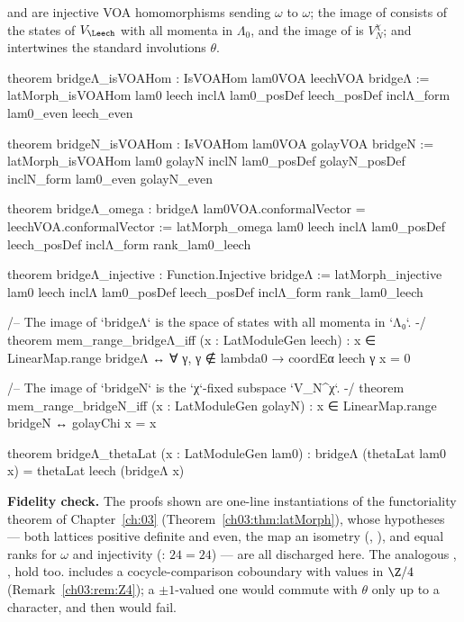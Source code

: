 \begin{theorem}\label{ch11:thm:bridges}
 and  are injective VOA homomorphisms sending $\omega$ to $\omega$; the image
of  consists of the states of $V_\Leech$ with all momenta in $\Lambda_0$, and the image of
 is $V_N^\chi$; and  intertwines the standard involutions $\theta$.
\end{theorem}
\begin{leancode}
theorem bridgeΛ_isVOAHom : IsVOAHom lam0VOA leechVOA bridgeΛ :=
  latMorph_isVOAHom lam0 leech inclΛ lam0_posDef leech_posDef inclΛ_form lam0_even leech_even

theorem bridgeN_isVOAHom : IsVOAHom lam0VOA golayVOA bridgeN :=
  latMorph_isVOAHom lam0 golayN inclN lam0_posDef golayN_posDef inclN_form lam0_even golayN_even

theorem bridgeΛ_omega : bridgeΛ lam0VOA.conformalVector = leechVOA.conformalVector :=
  latMorph_omega lam0 leech inclΛ lam0_posDef leech_posDef inclΛ_form rank_lam0_leech

theorem bridgeΛ_injective : Function.Injective bridgeΛ :=
  latMorph_injective lam0 leech inclΛ lam0_posDef leech_posDef inclΛ_form rank_lam0_leech

/-- The image of `bridgeΛ` is the space of states with all momenta in `Λ₀`. -/
theorem mem_range_bridgeΛ_iff (x : LatModuleGen leech) :
    x ∈ LinearMap.range bridgeΛ ↔ ∀ γ, γ ∉ lambda0 → coordEα leech γ x = 0

/-- The image of `bridgeN` is the `χ`-fixed subspace `V_N^χ`. -/
theorem mem_range_bridgeN_iff (x : LatModuleGen golayN) :
    x ∈ LinearMap.range bridgeN ↔ golayChi x = x

theorem bridgeΛ_thetaLat (x : LatModuleGen lam0) :
    bridgeΛ (thetaLat lam0 x) = thetaLat leech (bridgeΛ x)
\end{leancode}
\begin{dictionary}
\textbf{Fidelity check.}  The proofs shown are one-line instantiations of the functoriality theorem
of Chapter~\ref{ch:03} (Theorem~\ref{ch03:thm:latMorph}), whose hypotheses --- both lattices positive
definite and even, the map an isometry (, ), and equal ranks for
$\omega$ and injectivity (: $24=24$) --- are all discharged here.  The
analogous , ,  hold too.
 includes a cocycle-comparison coboundary with values in $\Z/4$
(Remark~\ref{ch03:rem:Z4}); a $\pm1$-valued one would commute with $\theta$ only up to a
character, and then  would fail.
\end{dictionary}

